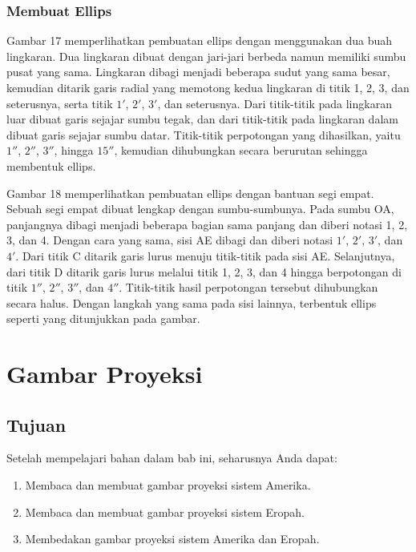\documentclass[11pt]{simart} %
\begin{document}
\subsubsection{Membuat Ellips}
Gambar 17 memperlihatkan pembuatan ellips dengan menggunakan dua buah lingkaran. Dua lingkaran dibuat dengan jari-jari berbeda namun memiliki sumbu pusat yang sama. Lingkaran dibagi menjadi beberapa sudut yang sama besar, kemudian ditarik garis radial yang memotong kedua lingkaran di titik 1, 2, 3, dan seterusnya, serta titik $1'$, $2'$, $3'$, dan seterusnya. Dari titik-titik pada lingkaran luar dibuat garis sejajar sumbu tegak, dan dari titik-titik pada lingkaran dalam dibuat garis sejajar sumbu datar. Titik-titik perpotongan yang dihasilkan, yaitu $1''$, $2''$, $3''$, hingga $15''$, kemudian dihubungkan secara berurutan sehingga membentuk ellips.

Gambar 18 memperlihatkan pembuatan ellips dengan bantuan segi empat. Sebuah segi empat dibuat lengkap dengan sumbu-sumbunya. Pada sumbu OA, panjangnya dibagi menjadi beberapa bagian sama panjang dan diberi notasi 1, 2, 3, dan 4. Dengan cara yang sama, sisi AE dibagi dan diberi notasi $1'$, $2'$, $3'$, dan $4'$. Dari titik C ditarik garis lurus menuju titik-titik pada sisi AE. Selanjutnya, dari titik D ditarik garis lurus melalui titik 1, 2, 3, dan 4 hingga berpotongan di titik $1''$, $2''$, $3''$, dan $4''$. Titik-titik hasil perpotongan tersebut dihubungkan secara halus. Dengan langkah yang sama pada sisi lainnya, terbentuk ellips seperti yang ditunjukkan pada gambar.

\section{Gambar Proyeksi}%
\label{sec:Gambar Proyeksi}


\subsection{Tujuan}%
\label{sub:Tujuan}

Setelah mempelajari bahan dalam bab ini, seharusnya Anda dapat:

\begin{enumerate}
	\item Membaca dan membuat gambar proyeksi sistem Amerika.
	\item Membaca dan membuat gambar proyeksi sistem Eropah.
	\item Membedakan gambar proyeksi sistem Amerika dan Eropah.
\end{enumerate}
\end{document}
